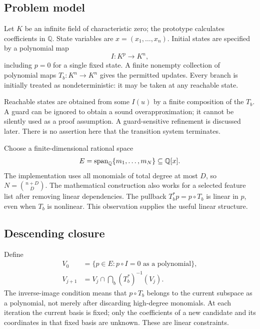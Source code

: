 \documentclass[11pt,letterpaper]{article}
\newcommand{\Q}{\mathbb Q}\newcommand{\R}{\mathbb R}\newcommand{\N}{\mathbb N}
\theoremstyle{definition}\newtheorem{definition}[theorem]{Definition}
\theoremstyle{remark}\newtheorem{remark}[theorem]{Remark}
\begin{document}
\subsection{Problem model}
Let $K$ be an infinite field of characteristic zero; the prototype calculates
coefficients in $\Q$. State variables are $x=(x_1,\ldots,x_n)$. Initial states
are specified by a polynomial map
\[
 I:K^p\longrightarrow K^n,
\]
including $p=0$ for a single fixed state. A finite nonempty collection of
polynomial maps $T_b:K^n\to K^n$ gives the permitted updates. Every branch is
initially treated as nondeterministic: it may be taken at any reachable state.

Reachable states are obtained from some $I(u)$ by a finite composition of the
$T_b$. A guard can be ignored to obtain a sound overapproximation; it cannot be
silently used as a proof assumption. A guard-sensitive refinement is discussed
later. There is no assertion here that the transition system terminates.

Choose a finite-dimensional rational space
\[
 E=\Span_{\Q}\{m_1,\ldots,m_N\}\subseteq\Q[x].
\]
The implementation uses all monomials of total degree at most $D$, so
$N=\binom{n+D}{D}$. The mathematical construction also works for a selected
feature list after removing linear dependencies. The pullback
$T_b^*p=p\circ T_b$ is linear in $p$, even when $T_b$ is nonlinear.
This observation supplies the useful linear structure.

\subsection{Descending closure}
Define
\begin{align}
 V_0&=\{p\in E:p\circ I=0\text{ as a polynomial}\},\label{eq:v0}\\
 V_{j+1}&=V_j\cap\bigcap_b(T_b^*)^{-1}(V_j).
 \label{eq:vnext}
\end{align}
The inverse-image condition means that $p\circ T_b$ belongs to the current
subspace as a polynomial, not merely after discarding high-degree monomials.
At each iteration the current basis is fixed; only the coefficients of a new
candidate and its coordinates in that fixed basis are unknown. These are linear
constraints.
\end{document}

